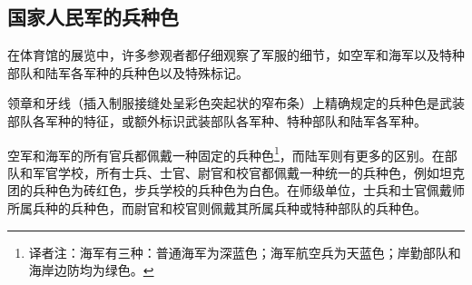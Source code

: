 \subsection{国家人民军的兵种色}

在体育馆的展览中，许多参观者都仔细观察了军服的细节，如空军和海军以及特种部队和陆军各军种的兵种色以及特殊标记。

领章和牙线（插入制服接缝处呈彩色突起状的窄布条）上精确规定的兵种色是武装部队各军种的特征，或额外标识武装部队各军种、特种部队和陆军各军种。

空军和海军的所有官兵都佩戴一种固定的兵种色\footnote{译者注：海军有三种：普通海军为深蓝色；海军航空兵为天蓝色；岸勤部队和海岸边防均为绿色。\cite{clarionv}}，而陆军则有更多的区别。在部队和军官学校，所有士兵、士官、尉官和校官都佩戴一种统一的兵种色，例如坦克团的兵种色为砖红色，步兵学校的兵种色为白色。在师级单位，士兵和士官佩戴师所属兵种的兵种色，而尉官和校官则佩戴其所属兵种或特种部队的兵种色。

